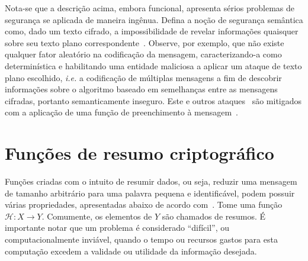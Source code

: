 \documentclass{ufsctex/ufsctex}
\begin{document}
Nota-se que a descrição acima, embora funcional, apresenta sérios problemas de
segurança se aplicada de maneira ingênua. Defina a noção de segurança
semântica como, dado um texto cifrado, a impossibilidade de revelar informações
quaisquer sobre seu texto plano
correspondente~\cite{Goldwasser:1982:PEA:800070.802212}. Observe, por exemplo,
que não existe qualquer fator aleatório na codificação da mensagem,
caracterizando-a como determinística e habilitando uma entidade maliciosa a
aplicar um ataque de texto plano escolhido, \emph{i.e.} a codificação de
múltiplas mensagens a fim de descobrir informações sobre o algoritmo baseado em
semelhanças entre as mensagens cifradas, portanto semanticamente inseguro. Este
e outros ataques~\cite{Boneh99twentyyears} são mitigados com a aplicação de uma
função de preenchimento à mensagem~\cite{Bellare1995}.

\section{Funções de resumo criptográfico}\label{section:hashfunc}

Funções criadas com o intuito de resumir dados, ou seja, reduzir uma mensagem
de tamanho arbitrário para uma palavra pequena e identificável, podem possuir
várias propriedades, apresentadas abaixo de acordo
com~\cite[9.2]{Menezes:1996:HAC:548089}.  Tome uma função $\mathcal{H} : X
\longrightarrow Y$. Comumente, os elementos de $Y$ são chamados de resumos. É
importante notar que um problema é considerado ``difícil'', ou
computacionalmente inviável, quando o tempo ou recursos gastos para esta
computação excedem a validade ou utilidade da informação desejada.
\end{document}
